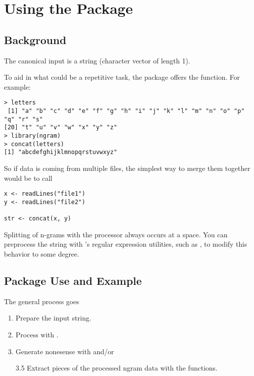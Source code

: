 \section{Using the Package}


\subsection{Background}

The canonical input is a string (character vector of length 1).  

To aid in what could be a repetitive task, the package offers 
the  function.  For example:

\begin{lstlisting}[language=inteRactive]
> letters
 [1] "a" "b" "c" "d" "e" "f" "g" "h" "i" "j" "k" "l" "m" "n" "o" "p" "q" "r" "s"
[20] "t" "u" "v" "w" "x" "y" "z"
> library(ngram)
> concat(letters)
[1] "abcdefghijklmnopqrstuvwxyz"
\end{lstlisting}

So if data is coming from multiple files, the simplest way to merge them 
together would be to call

\begin{lstlisting}[language=rr]
x <- readLines("file1")
y <- readLines("file2")

str <- concat(x, y)
\end{lstlisting}

Splitting of n-grams with the processor  always occurs at a 
space. You can preprocess the string with \R's regular expression 
utilities, such as , to modify this behavior to some degree.



\subsection{Package Use and Example}

The general process goes
\begin{enumerate}
  \item Prepare the input string.
  \item Process with .
  \item Generate nonesense with  and/or
  \item[3.5] Extract pieces of the processed ngram data with the  
functions.
\end{enumerate}



